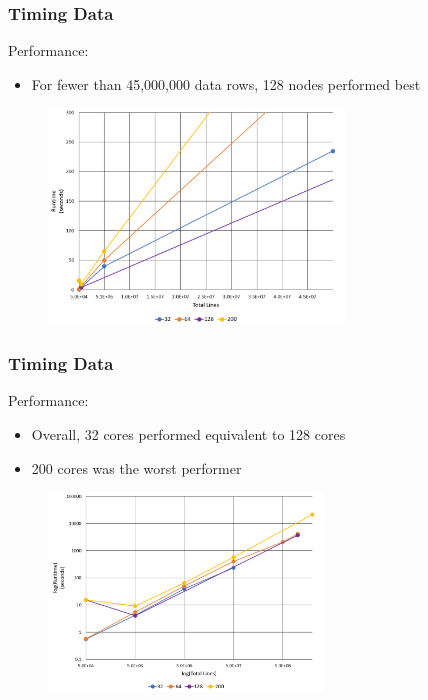 \documentclass[usernames,dvipsnames]{beamer}
\begin{document}
\begin{frame}[fragile]	
	\frametitle{Timing Data}
	
        	\begin{block}{Performance:}
        		\begin{itemize}
        			\item For fewer than 45,000,000 data rows, 128 nodes performed best
        		\end{itemize}
        	\end{block}
        	\begin{figure}
            \centering
	        \includegraphics[width=0.7\textwidth]{images/Runtime1.png}
	        \end{figure}
\end{frame}


\begin{frame}[fragile]	
	\frametitle{Timing Data}
	
        	\begin{block}{Performance:}
        		\begin{itemize}
        			\item Overall, 32 cores performed equivalent to 128 cores
        			\item 200 cores was the worst performer
        		\end{itemize}
        	\end{block}
        	\begin{figure}
            \centering
	        \includegraphics[width=0.65\textwidth]{images/Runtime2.png}
	        \end{figure}
\end{frame}
\end{document}
